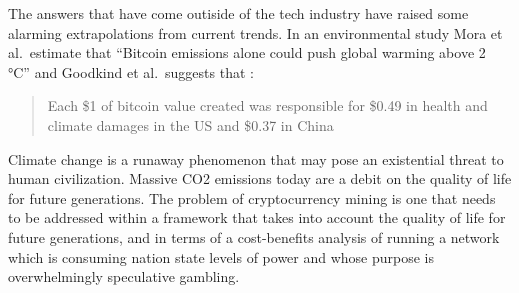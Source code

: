 The answers that have come outiside of the tech industry have raised some
alarming extrapolations from current trends.  In an environmental study Mora et
al.~estimate that ``Bitcoin emissions alone could push global warming above 2
°C'' \cite{mora2018bitcoin} and Goodkind et al.~suggests that
\cite{goodkind_cryptodamages_2020}:

\begin{quote}
Each \$1 of bitcoin value created was
responsible for \$0.49 in health and climate damages in the US and
\$0.37 in China
\end{quote}

Climate change is a runaway phenomenon that may pose an existential threat to
human civilization. Massive CO2 emissions today are a debit on the quality of
life for future generations. The problem of cryptocurrency mining is one that
needs to be addressed within a framework that takes into account the quality of
life for future generations, and in terms of a cost-benefits analysis of running
a network which is consuming nation state levels of power and whose purpose is
overwhelmingly speculative gambling.
